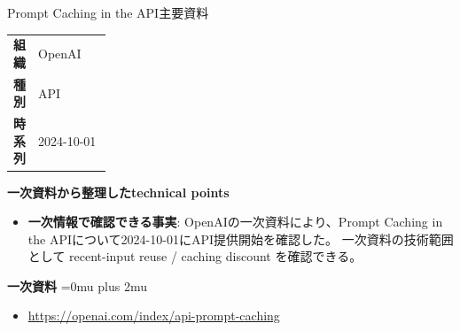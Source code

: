 \begin{technicalnote}{Prompt Caching in the API}{主要資料}
\begingroup
\begin{tabularx}{\linewidth}{@{}>{\bfseries}p{0.22\linewidth}X@{}}
組織 & OpenAI \\
種別 & API \\
時系列 & 2024-10-01 \\
\end{tabularx}
\smallskip
{\bfseries 一次資料から整理したtechnical points}
\begin{itemize}[leftmargin=1.5em,itemsep=0.35em]
\item \textbf{一次情報で確認できる事実}: OpenAIの一次資料により、Prompt Caching in the APIについて2024-10-01にAPI提供開始を確認した。 一次資料の技術範囲として recent-input reuse / caching discount を確認できる。
\end{itemize}
\begin{minipage}{\linewidth}
\begin{samepage}
{\bfseries 一次資料}
\begingroup\sloppy
\Urlmuskip=0mu plus 2mu\relax
\begin{itemize}[leftmargin=1.5em,itemsep=0.25em]
\item {\scriptsize\url{https://openai.com/index/api-prompt-caching}}
\end{itemize}
\endgroup
\end{samepage}
\end{minipage}
\endgroup
\end{technicalnote}
\medskip


